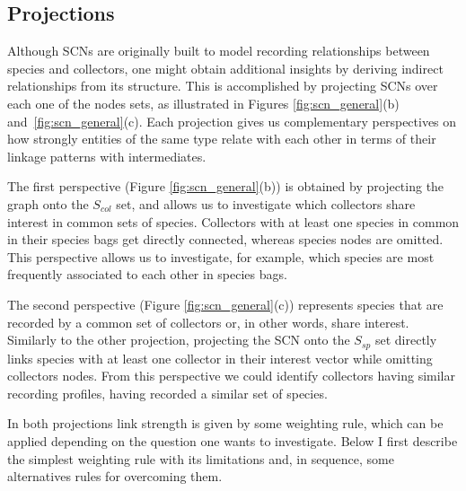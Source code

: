 
\subsection{Projections}

Although SCNs are originally built to model recording relationships between species and collectors, one might obtain additional insights by deriving indirect relationships from its structure. This is accomplished by projecting SCNs over each one of the nodes sets, as illustrated in Figures \ref{fig:scn_general}(b)
and~\ref{fig:scn_general}(c). Each projection gives us complementary perspectives on how strongly entities of the same type relate with each other in terms of their linkage patterns with intermediates.


The first perspective (Figure \ref{fig:scn_general}(b)) is obtained by projecting the graph onto the $S_{col}$ set, and allows us to investigate which collectors share interest in common sets of species. Collectors with at least one species in common in their species bags get directly connected, whereas species nodes are omitted. This perspective allows us to investigate, for example, which species are most frequently associated to each other in species bags.%

The second perspective (Figure \ref{fig:scn_general}(c)) represents species that are recorded by a common set of collectors or, in other words, share interest. Similarly to the other projection, projecting the SCN onto the $S_{sp}$ set directly links species with at least one collector in their interest vector while omitting collectors nodes. From this perspective we could identify collectors having similar recording profiles, having recorded a similar set of species. 

In both projections link strength is given by some weighting rule, which can be applied depending on the question one wants to investigate. Below I first describe the simplest weighting rule with its limitations and, in sequence, some alternatives rules for overcoming them.

